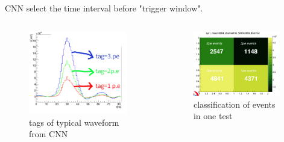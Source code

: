 \documentclass[11pt,compress,xcolor=x11names,UTF8]{beamer}
\begin{document}
\begin{frame}{CNN}
select the time interval before "trigger window".
\begin{columns}
\begin{column}{.485\textwidth}
\begin{figure}
\centering
\includegraphics[width=0.94\textwidth]{figure/cnntags.png} %
\caption{tags of typical waveform from CNN}
\end{figure}
\end{column}
\begin{column}{.485\textwidth}
\begin{figure}
\centering
\includegraphics[width=0.94\textwidth]{figure/cnnres.png} %
\caption{classification of events in one test}
\end{figure}
\end{column}
\end{columns}
\end{frame}
\end{document}
